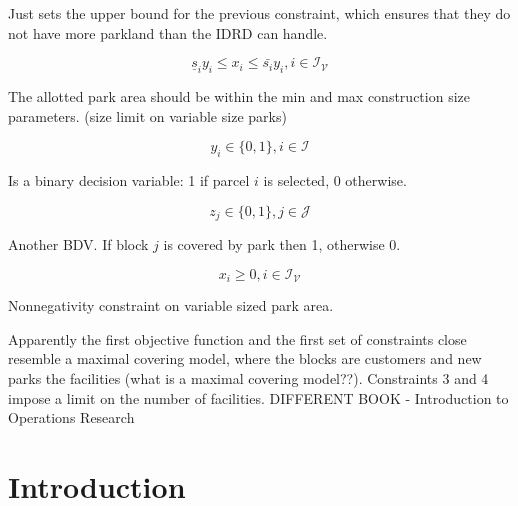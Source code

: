 \documentclass{article}
\begin{document}
Just sets the upper bound for the previous constraint, which ensures that they do not have more parkland than the IDRD can handle.

\begin{equation}
\underline{s}_iy_i \leq x_i \leq \bar{s_i}y_i, i \in \mathcal{I_V}
\end{equation}

The allotted park area should be within the min and max construction size parameters. (size limit on variable size parks)

\begin{equation}
y_i \in \{0,1\}, i \in \mathcal{I}
\end{equation}

Is a binary decision variable: 1 if parcel $i$ is selected, 0 otherwise.

\begin{equation}
z_j \in \{0,1\}, j \in \mathcal{J}
\end{equation}

Another BDV. If block $j$ is covered by park then 1, otherwise 0.

\begin{equation}
x_i \geq 0, i \in \mathcal{I_V}
\end{equation}

Nonnegativity constraint on variable sized park area. \newline \newline


Apparently the first objective function and the first set of constraints close resemble a maximal covering model, where the blocks are customers and new parks the facilities (what is a maximal covering model??). Constraints 3 and 4 impose a limit on the number of facilities.
%
%
%
%
%
%
\newpage
{\LARGE DIFFERENT BOOK - Introduction to Operations Research}
\setcounter{section}{0}
\section{Introduction}
\end{document}
